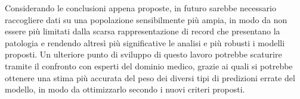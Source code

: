 Considerando le conclusioni appena proposte, in futuro sarebbe necessario raccogliere dati su una popolazione sensibilmente più ampia, in modo da non essere più limitati dalla scarsa rappresentazione di record che presentano la patologia e rendendo altresì più significative le analisi e più robusti i modelli proposti.
Un ulteriore punto di sviluppo di questo lavoro potrebbe scaturire tramite il confronto con esperti del dominio medico, grazie ai quali si potrebbe ottenere una stima più accurata del peso dei diversi tipi di predizioni errate del modello, in modo da ottimizzarlo secondo i nuovi criteri proposti.